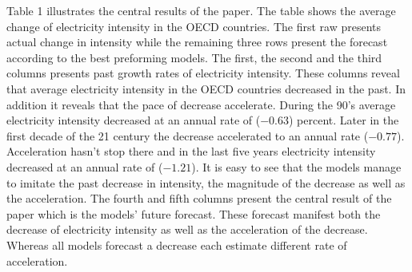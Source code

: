 \documentclass[]{amsart}
\begin{document}
Table 1 illustrates the central results of the paper. The table shows the average change of electricity intensity in the OECD countries. The first raw presents actual change in intensity while the remaining three rows present the forecast according to the best preforming models. The first, the second and the third columns presents past growth rates of electricity intensity. These columns reveal that average electricity intensity in the OECD countries decreased in the past. In addition it reveals that the pace of decrease accelerate. During the 90's average electricity intensity decreased at an annual rate of ($-0.63$) percent. Later in the first decade of the 21 century the decrease accelerated to an annual rate ($-0.77$). Acceleration hasn't stop there and in the last five years electricity intensity decreased at an annual rate of ($-1.21$). It is easy to see that the models manage to imitate the past decrease in intensity, the magnitude of the decrease as well as the acceleration. The fourth and fifth columns present the central result of the paper which is the models' future forecast. These forecast manifest both the decrease of electricity intensity as well as the acceleration of the decrease. Whereas all models forecast a decrease each estimate different rate of acceleration. 
\end{document}
